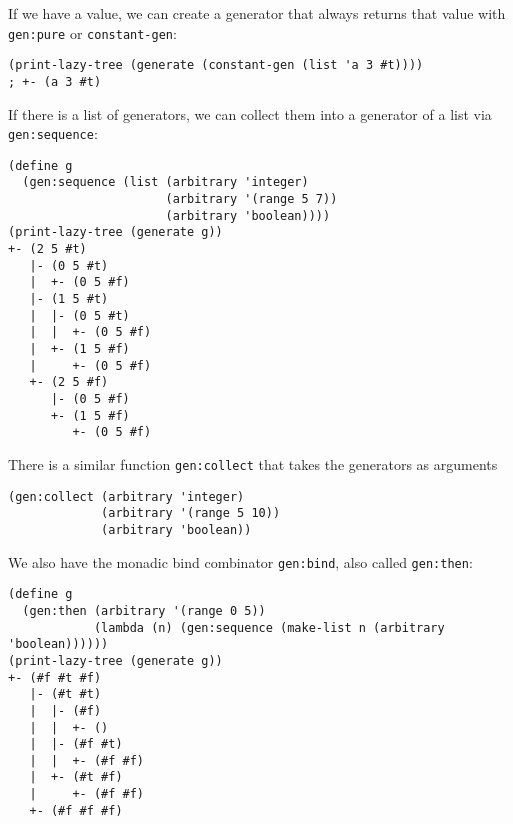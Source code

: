 \documentclass{scrartcl}
\begin{document}
If we have a value, we can create a generator that always returns
that value with \verb|gen:pure| or \verb|constant-gen|:
\begin{verbatim}
(print-lazy-tree (generate (constant-gen (list 'a 3 #t))))
; +- (a 3 #t)
\end{verbatim}

If there is a list of generators, we can collect them into a generator of a list
via \verb|gen:sequence|:
\begin{verbatim}
(define g
  (gen:sequence (list (arbitrary 'integer)
                      (arbitrary '(range 5 7))
                      (arbitrary 'boolean))))
(print-lazy-tree (generate g))
+- (2 5 #t)
   |- (0 5 #t)
   |  +- (0 5 #f)
   |- (1 5 #t)
   |  |- (0 5 #t)
   |  |  +- (0 5 #f)
   |  +- (1 5 #f)
   |     +- (0 5 #f)
   +- (2 5 #f)
      |- (0 5 #f)
      +- (1 5 #f)
         +- (0 5 #f)
\end{verbatim}

There is a similar function \verb|gen:collect| that takes the generators
as arguments
\begin{verbatim}
(gen:collect (arbitrary 'integer)
             (arbitrary '(range 5 10))
             (arbitrary 'boolean))
\end{verbatim}

We also have the monadic bind combinator \verb|gen:bind|,
also called \verb|gen:then|:
\begin{verbatim}
(define g
  (gen:then (arbitrary '(range 0 5))
            (lambda (n) (gen:sequence (make-list n (arbitrary 'boolean))))))
(print-lazy-tree (generate g))
+- (#f #t #f)
   |- (#t #t)
   |  |- (#f)
   |  |  +- ()
   |  |- (#f #t)
   |  |  +- (#f #f)
   |  +- (#t #f)
   |     +- (#f #f)
   +- (#f #f #f)
\end{verbatim}
\end{document}
